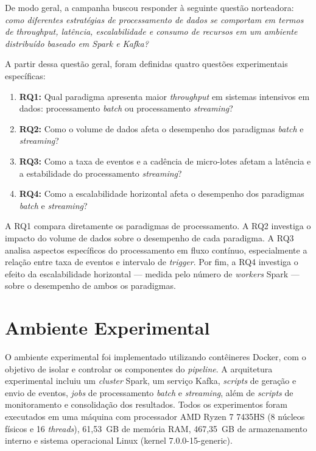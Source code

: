 De modo geral, a campanha buscou responder à seguinte questão norteadora: \textit{como diferentes estratégias de processamento de dados se comportam em termos de throughput, latência, escalabilidade e consumo de recursos em um ambiente distribuído baseado em Spark e Kafka?}
 
A partir dessa questão geral, foram definidas quatro questões experimentais específicas:
 
\begin{enumerate}
    \item \textbf{RQ1:} Qual paradigma apresenta maior \textit{throughput} em sistemas intensivos em dados: processamento \textit{batch} ou processamento \textit{streaming}?
    \item \textbf{RQ2:} Como o volume de dados afeta o desempenho dos paradigmas \textit{batch} e \textit{streaming}?
    \item \textbf{RQ3:} Como a taxa de eventos e a cadência de micro-lotes afetam a latência e a estabilidade do processamento \textit{streaming}?
    \item \textbf{RQ4:} Como a escalabilidade horizontal afeta o desempenho dos paradigmas \textit{batch} e \textit{streaming}?
\end{enumerate}
 
A RQ1 compara diretamente os paradigmas de processamento. A RQ2 investiga o impacto do volume de dados sobre o desempenho de cada paradigma. A RQ3 analisa aspectos específicos do processamento em fluxo contínuo, especialmente a relação entre taxa de eventos e intervalo de \textit{trigger}. Por fim, a RQ4 investiga o efeito da escalabilidade horizontal --- medida pelo número de \textit{workers} Spark --- sobre o desempenho de ambos os paradigmas.
 
\section{Ambiente Experimental}
\label{sec:ambiente-experimental}
 
O ambiente experimental foi implementado utilizando contêineres Docker, com o objetivo de isolar e controlar os componentes do \textit{pipeline}. A arquitetura experimental incluiu um \textit{cluster} Spark, um serviço Kafka, \textit{scripts} de geração e envio de eventos, \textit{jobs} de processamento \textit{batch} e \textit{streaming}, além de \textit{scripts} de monitoramento e consolidação dos resultados. Todos os experimentos foram executados em uma máquina com processador AMD Ryzen 7 7435HS (8 núcleos físicos e 16 \textit{threads}), 61,53~GB de memória RAM, 467,35~GB de armazenamento interno e sistema operacional Linux (kernel 7.0.0-15-generic).
 
